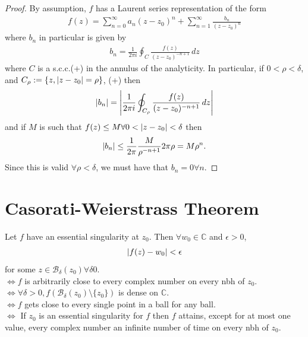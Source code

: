 \documentclass{article}
\theoremstyle{definition}
\newcommand{\f}[2]{\frac{#1}{#2}}
\newcommand{\C}{\mathbb{C}}
\begin{document}
\noindent \begin{proof}
	By assumption, $f$ has a Laurent series representation of the form
	\begin{align}
	f(z) = \sum^\infty_{n=0}a_n(z-z_0)^n + \sum^\infty_{n=1}\f{b_n}{(z-z_0)^n}  
	\end{align}
	where $b_n$ in particular is given by
	\begin{align}
	b_n = \f{1}{2\pi i}\oint_C \f{f(z)}{(z-z_0)^{-n+1}}\,dz
	\end{align}
	where $C$ is a s.c.c.(+) in the annulus of the analyticity. In particular, if $0 < \rho < \delta$, and $C_\rho := \{ z, \abs{z - z_0} = \rho \}$, (+) then
	\begin{align}
	\abs{b_n} = \abs{\f{1}{2\pi i}\oint_{C_\rho} \f{f(z)}{(z-z_0)^{-n+1}}\,dz}
	\end{align} 
	and if $M$ is such that $f(z) \leq M \forall 0 < \abs{z-z_0} < \delta$ then 
	\begin{align}
	\abs{b_n} \leq \f{1}{2\pi}\f{M}{\rho^{-n+1}}2\pi \rho = M \rho^{n}.
	\end{align}
	Since this is valid $\forall \rho < \delta$, we must have that $b_n = 0 \forall n$. \qedhere
\end{proof}


\section{Casorati-Weierstrass Theorem}

Let  $f$ have an essential singularity at $z_0$. Then $\forall w_0 \in \C$ and $\epsilon > 0$,
\begin{align}
\abs{f(z) - w_0} < \epsilon 
\end{align}
for some $z\in \mathcal{B}_\delta(z_0) \forall \delta  0$.\\
$\iff f$ is arbitrarily close to every complex number on every nbh of $z_0$.\\
$\iff \forall \delta > 0, f(\mathcal{B}_\delta(z_0)\setminus\{z_0\} )$ is dense on $\C$. \\
$\iff f$ gets close to every single point in a ball for any ball.\\
$\iff$ If $z_0$ is an essential singularity for $f$ then $f$ attains, except for at most one value, every complex number an infinite  number of time on every nbh of $z_0$.\\
\end{document}
